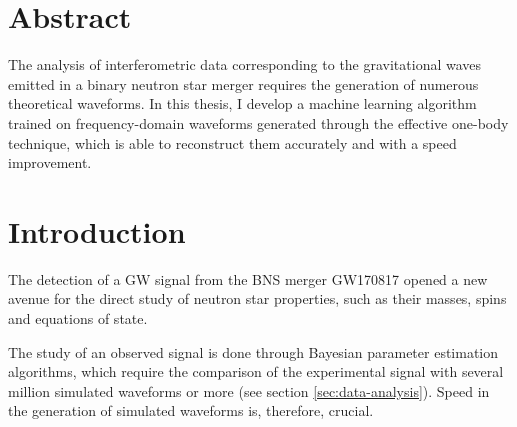 \documentclass[main.tex]{subfiles}
\begin{document}
\vspace*{\fill}
\section*{Abstract}
The analysis of interferometric data corresponding to the gravitational waves emitted in a binary neutron star merger requires the generation of numerous theoretical waveforms.
In this thesis, I develop a machine learning algorithm trained on frequency-domain waveforms generated through the effective one-body technique, which is able to reconstruct them accurately and with a speed improvement.
\vspace*{\fill}


\newpage




\section*{Introduction}


The detection of a \ac{GW} signal from the \ac{BNS} merger GW170817 \cite{abbottGW170817ObservationGravitational2017} opened a new avenue for the direct study of neutron star properties, such as their masses, spins and equations of state.

The study of an observed signal is done through Bayesian parameter estimation algorithms, which require the comparison of the experimental signal with several million \cite{lackeyEffectiveonebodyWaveformsBinary2017} simulated waveforms or more (see section \ref{sec:data-analysis}).
Speed in the generation of simulated waveforms is, therefore, crucial.
\end{document}

